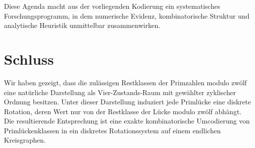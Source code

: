 \documentclass[11pt]{article}
\theoremstyle{definition}
\begin{document}
Diese Agenda macht aus der vorliegenden Kodierung ein systematisches Forschungsprogramm,
in dem numerische Evidenz, kombinatorische Struktur und analytische Heuristik unmittelbar zusammenwirken.

\section{Schluss}

Wir haben gezeigt, dass die zul\"assigen Restklassen der Primzahlen modulo zw\"olf eine nat\"urliche Darstellung als Vier-Zustands-Raum mit gew\"ahlter zyklischer Ordnung besitzen.
Unter dieser Darstellung induziert jede Priml\"ucke eine diskrete Rotation, deren Wert nur von der Restklasse der L\"ucke modulo zw\"olf abh\"angt.
Die resultierende Entsprechung ist eine exakte kombinatorische Umcodierung von Priml\"uckenklassen in ein diskretes Rotationssystem auf einem endlichen Kreisgraphen.
\end{document}
